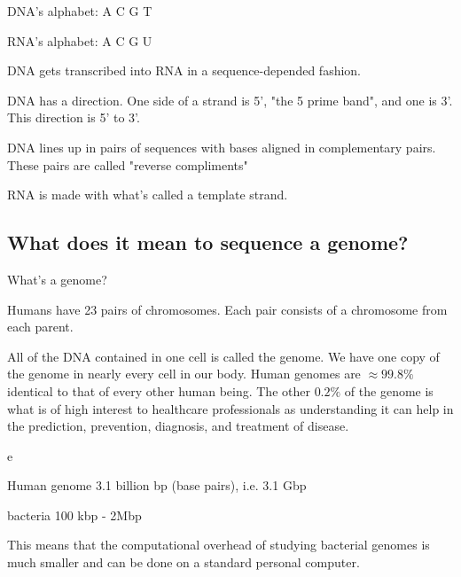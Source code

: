 DNA's alphabet: A C  G T

RNA's alphabet:  A C G U

DNA gets transcribed into RNA in a sequence-depended fashion.

DNA has a direction. One side of a strand is 5', "the 5 prime band", and one is 3'. This direction is 5' to 3'.

DNA lines up in pairs of sequences with bases aligned in complementary pairs. These pairs are called "reverse compliments"

RNA is made with what's called a template strand.

\subsection{What does it mean to sequence a genome?}

\begin{quest}
\item
	What's a genome?

	\begin{ans}
		Humans have 23 pairs of chromosomes. Each pair consists of a chromosome from each parent.

		All of the DNA contained in one cell is called the genome. We have one copy of the genome in nearly every cell in our body. Human genomes are $\approx99.8\%$  identical to that of every other human being. The other $0.2\%$ of the genome is what is of high interest to healthcare professionals as understanding it can help in the prediction, prevention, diagnosis, and treatment of disease.
	\end{ans}

\item
	e

\end{quest}


Human genome 3.1 billion bp (base pairs), i.e. 3.1 Gbp

bacteria 100 kbp - 2Mbp

This means that the computational overhead of studying bacterial genomes is much smaller and can be done on a standard personal computer.
